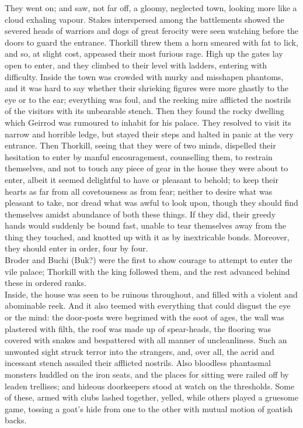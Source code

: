\documentclass[10pt,a4paper]{report}
\begin{document}
They went on; and saw, not far off, a gloomy, neglected town, looking more like a cloud exhaling vapour. Stakes interspersed among the battlements showed the severed heads of warriors and dogs of great ferocity were seen watching before the doors to guard the entrance. Thorkill threw them a horn smeared with fat to lick, and so, at slight cost, appeased their most furious rage. High up the gates lay open to enter, and they climbed to their level with ladders, entering with difficulty. Inside the town was crowded with murky and misshapen phantoms, and it was hard to say whether their shrieking figures were more ghastly to the eye or to the ear; everything was foul, and the reeking mire afflicted the nostrils of the visitors with its unbearable stench. Then they found the rocky dwelling which Geirrod was rumoured to inhabit for his palace. They resolved to visit its narrow and horrible ledge, but stayed their steps and halted in panic at the very entrance. Then Thorkill, seeing that they were of two minds, dispelled their hesitation to enter by manful encouragement, counselling them, to restrain themselves, and not to touch any piece of gear in the house they were about to enter, albeit it seemed delightful to have or pleasant to behold; to keep their hearts as far from all covetousness as from fear; neither to desire what was pleasant to take, nor dread what was awful to look upon, though they should find themselves amidst abundance of both these things. If they did, their greedy hands would suddenly be bound fast, unable to tear themselves away from the thing they touched, and knotted up with it as by inextricable bonds. Moreover, they should enter in order, four by four.\\

Broder and Buchi (Buk?) were the first to show courage to attempt to enter the vile palace; Thorkill with the king followed them, and the rest advanced behind these in ordered ranks.\\

Inside, the house was seen to be ruinous throughout, and filled with a violent and abominable reek. And it also teemed with everything that could disgust the eye or the mind: the door-posts were begrimed with the soot of ages, the wall was plastered with filth, the roof was made up of spear-heads, the flooring was covered with snakes and bespattered with all manner of uncleanliness. Such an unwonted sight struck terror into the strangers, and, over all, the acrid and incessant stench assailed their afflicted nostrils. Also bloodless phantasmal monsters huddled on the iron seats, and the places for sitting were railed off by leaden trellises; and hideous doorkeepers stood at watch on the thresholds. Some of these, armed with clubs lashed together, yelled, while others played a gruesome game, tossing a goat's hide from one to the other with mutual motion of goatish backs.\\
\end{document}
